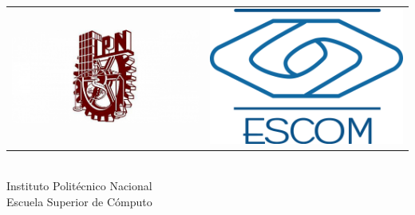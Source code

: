 
\begin{titlepage}

    
    {\small
    \begin{tabular}{
    	p{} p{}}
     \includegraphics[scale=0.12]{imagenes/IPN} & 
     \includegraphics[scale=0.07]{imagenes/logoescom} 
    \end{tabular}
	}
    \centering %
    \LARGE{\\ Instituto Polit\'ecnico Nacional}
    \LARGE{\\ Escuela Superior de C\'omputo}
    
    \vspace{1cm} %


\end{titlepage}
